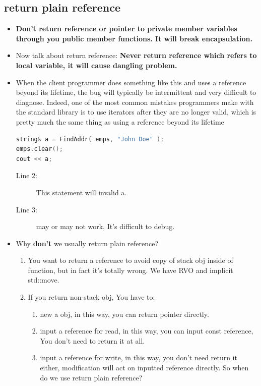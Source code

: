 \documentclass[a4paper,11pt,twoside]{book}
\begin{document}
\subsection{return plain reference} 
\begin{itemize}
	\item \textbf{Don't return reference or pointer to private member variables through you public member functions. It will break encapsulation. }
	
	\item Now talk about return reference: \textbf{Never return reference which refers to local variable, it will cause dangling problem.} 
	
	\item  When the client programmer does something like this and uses a reference beyond its lifetime, the bug will typically be intermittent and very difficult to diagnose. Indeed, one of the most common mistakes programmers make with the standard library is to use iterators after they are no longer valid, which is pretty much the same thing as using a reference beyond its lifetime
	
\begin{lstlisting}[frame=single, language=c++, mathescape=true]
string& a = FindAddr( emps, "John Doe" );
emps.clear(); 
cout << a; 
\end{lstlisting}
	\begin{description}
		\item[Line 2:] This statement will invalid a.
		\item[Line 3:] may or may not work, It's difficult to debug.
	\end{description}
	
	\item Why \textbf{don't} we usually return plain reference?
	\begin{enumerate}
	\item You want to return a reference to avoid copy of stack obj inside of function, but in fact it's totally wrong. We have RVO and implicit std::move.
	
	\item If you return non-stack obj, You have to:
		\begin{enumerate}
			\item new a obj, in this way, you can return pointer directly.
			\item input a reference for read, in this way, you can input const reference, You don't need to return it at all.
			\item input a reference for write, in this way, you don't need return it either, modification will act on inputted reference directly. So when do we use return plain reference?
		\end{enumerate}
	

\end{enumerate}
\end{itemize}
\end{document}
